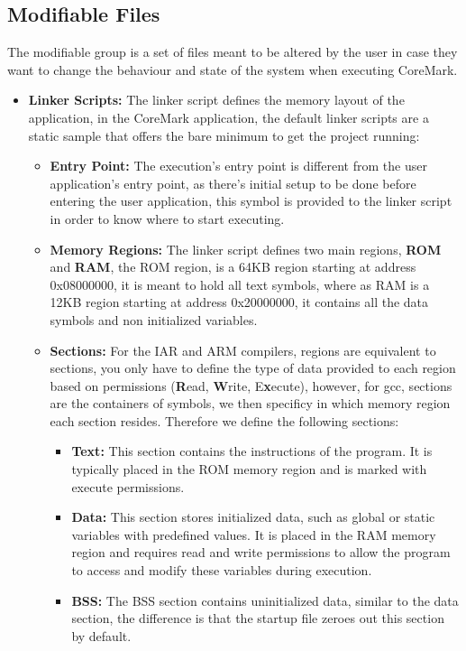 \subsection{Modifiable Files}
The modifiable group is a set of files meant to be altered by the user in case they want to change the behaviour and state of the system when executing CoreMark.
\begin{itemize}
    \item \textbf{Linker Scripts:} The linker script defines the memory layout of the application, in the CoreMark application, the default linker scripts are a static sample that offers the bare minimum to get the project running:
        \begin{itemize}
            \item \textbf{Entry Point:} The execution's entry point is different from the user application's entry point, as there's initial setup to be done before entering the user application, this symbol is provided to the linker script in order to know where to start executing.
            \item \textbf{Memory Regions:} The linker script defines two main regions, \textbf{ROM} and \textbf{RAM}, the ROM region, is a 64KB region starting at address 0x08000000, it is meant to hold all text symbols, where as RAM is a 12KB region starting at address 0x20000000, it contains all the data symbols and non initialized variables.
            \item \textbf{Sections:} For the IAR and ARM compilers, regions are equivalent to sections, you only have to define the type of data provided to each region based on permissions (\textbf{R}ead, \textbf{W}rite, E\textbf{x}ecute), however, for gcc, sections are the containers of symbols, we then specificy in which memory region each section resides. Therefore we define the following sections:
            \begin{itemize}
                \item \textbf{Text:} This section contains the instructions of the program. It is typically placed in the ROM memory region  and is marked with execute permissions.
                \item \textbf{Data:} This section stores initialized data, such as global or static variables with predefined values. It is placed in the RAM memory region and requires read and write permissions to allow the program to access and modify these variables during execution.
                \item \textbf{BSS:}  The BSS section contains uninitialized data, similar to the data section, the difference is that the startup file zeroes out this section by default.

\end{itemize}
\end{itemize}
\end{itemize}
